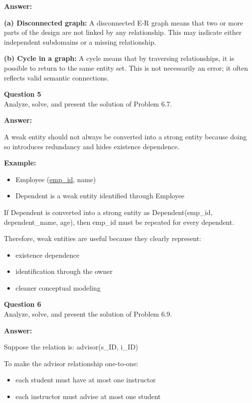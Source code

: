 \documentclass[12pt,a4paper]{article}
\begin{document}
\textbf{Answer:}

\textbf{(a) Disconnected graph:}  
A disconnected E-R graph means that two or more parts of the design are not linked by any relationship. This may indicate either independent subdomains or a missing relationship.

\textbf{(b) Cycle in a graph:}  
A cycle means that by traversing relationships, it is possible to return to the same entity set. This is not necessarily an error; it often reflects valid semantic connections.

\textbf{Question 5}\\
Analyze, solve, and present the solution of Problem 6.7.

\textbf{Answer:}

A weak entity should not always be converted into a strong entity because doing so introduces redundancy and hides existence dependence.

\textbf{Example:}
\begin{itemize}[leftmargin=1.5em]
    \item Employee (\underline{emp\_id}, name)
    \item Dependent is a weak entity identified through Employee
\end{itemize}

If Dependent is converted into a strong entity as  
Dependent(emp\_id, dependent\_name, age),  
then emp\_id must be repeated for every dependent.

Therefore, weak entities are useful because they clearly represent:
\begin{itemize}[leftmargin=1.5em]
    \item existence dependence
    \item identification through the owner
    \item cleaner conceptual modeling
\end{itemize}

\textbf{Question 6}\\
Analyze, solve, and present the solution of Problem 6.9.

\textbf{Answer:}

Suppose the relation is:
advisor(s\_ID, i\_ID)

To make the advisor relationship one-to-one:
\begin{itemize}[leftmargin=1.5em]
    \item each student must have at most one instructor
    \item each instructor must advise at most one student
\end{itemize}
\end{document}
